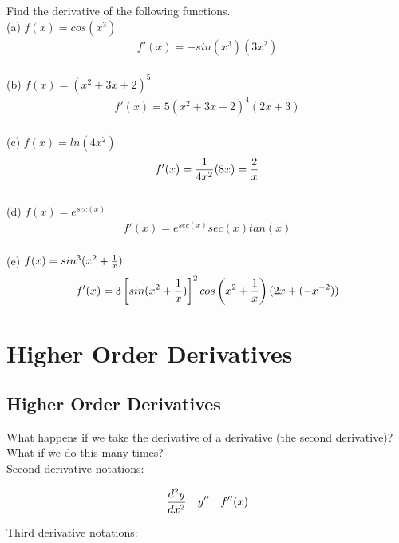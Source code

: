 \begin{exercise}\nonumber
    Find the derivative of the following functions. \\

    (a) $ f(x) = cos(x^3) $
    \begin{align}
        f'(x) = -sin(x^3)(3x^2)
    \end{align}
    \\

    (b) $ f(x) = (x^2 + 3x + 2)^5 $
    \begin{align}
        f'(x) = 5(x^2 + 3x + 2)^4(2x+3)
    \end{align}
    \\

    (c) $ f(x) = ln(4x^2) $
    \begin{align}
        f'(x) = {1 \over 4x^2}(8x) = {2 \over x}
    \end{align}
    \\

    (d) $ f(x) = e^{sec(x)} $
    \begin{align}
        f'(x) = e^{sec(x)}sec(x)tan(x)
    \end{align}
    \\

    (e) $ f(x) = sin^3(x^2 + {1 \over x}) $
    \begin{align}
        f'(x) = 3\left[sin(x^2+{1 \over x})\right]^2cos\left(x^2+{1 \over x}\right)(2x+(-x^{-2}))
    \end{align}
\end{exercise}

\chapter{Higher Order Derivatives}

\section{Higher Order Derivatives}

What happens if we take the derivative of a derivative (the second derivative)? What if we do this many times? \\

Second derivative notations:

\begin{align}\nonumber
    {d^2y \over dx^2} &  & y'' &  & f''(x)
\end{align}

Third derivative notations:

